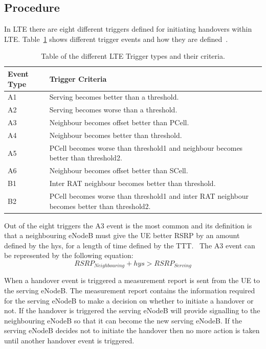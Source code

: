 \subsection{Procedure}\label{procedure}
In LTE there are eight different triggers defined for initiating handovers within LTE. Table~\ref{tab:trigger} shows different trigger events and how they are defined~\cite{3gpp2012triggers}. 
\begin{table}[H]
  \begin{center}
    \begin{tabular}{| l | p{11.1cm} |}
  	  \hline
      \textbf{Event Type} & \textbf{Trigger Criteria} \\ \hline
      A1 & Serving becomes better than a threshold. \\
      A2 & Serving becomes worse than a threshold. \\
      A3 & Neighbour becomes offset better than \ac{PCell}. \\
      A4 & Neighbour becomes better than threshold. \\
      A5 & \ac{PCell} becomes worse than threshold1 and neighbour becomes better than threshold2. \\
      A6 & Neighbour becomes offset better than \ac{SCell}. \\
      B1 & Inter RAT neighbour becomes better than threshold. \\
      B2 & \ac{PCell} becomes worse than threshold1 and inter RAT neighbour becomes better than threshold2. \\
      \hline
  	\end{tabular}
  \end{center}
  \caption{Table of the different LTE Trigger types and their criteria.}
  \label{tab:trigger}
\end{table}
Out of the eight triggers the A3 event is the most common and its definition is that a neighbouring eNodeB must give the UE better \ac{RSRP} by an amount defined by the hys, for a length of time defined by the TTT.~\cite{sinclair2013handover} The A3 event can be represented by the following equation:
\begin{equation}
RSRP_{Neighbouring} + hys > RSRP_{Serving}
\end{equation}
 
When a handover event is triggered a measurement report is sent from the UE to the serving eNodeB. The measurement report contains the information required for the serving eNodeB to make a decision on whether to initiate a handover or not. If the handover is triggered the serving eNodeB will provide signalling to the neighbouring eNodeB so that it can become the new serving eNodeB. If the serving eNodeB decides not to initiate the handover then no more action is taken until another handover event is triggered.

